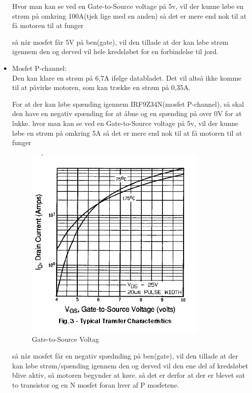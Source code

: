 \begin{itemize}
	Hvor man kan se ved en Gate-to-Source voltage på 5v, vil der kunne 
	løbe en strøm på omkring 100A(tjek lige med en anden) så det er mere end nok til at
	få motoren til at funger
	
	så når mosfet får 5V på ben(gate), vil den tillade at der kan løbe strøm
	igennem den og derved vil hele kredsløbet for en forbindelse til jord.
	\item 
	Mosfet P-channel: \\
	Den kan klare en strøm på 6,7A ifølge databladet. Det vil altså ikke komme til at påvirke motoren, som kan trække en strøm på 0,35A. 
	
	For at der kan løbe spænding igennem IRF9Z34N(mosfet P-channel), så skal den have en negativ spænding for at åbne og en spænding på over 0V for at lukke. 
	hvor man kan se ved en Gate-to-Source voltage på 5v, vil der kunne 
	løbe en strøm på omkring 5A så det er mere end nok til at
	få motoren til at funger
	\begin{figure}[H]
		\centering
		\includegraphics[width=\textwidth]{DesignOgImplementering/images/grafp}
		\caption{Gate-to-Source Voltag}
	\end{figure}
	så når mosfet får en negativ spædnding på ben(gate), vil den tillade at der kan løbe strøm/spænding
	igennem den og derved vil den ene del af kredsløbet blive aktiv, så motoren begynder at køre.
	så det er derfor at der er blevet sat to transistor og en N mosfet foran hver af P mosfetene.
	
	
\end{itemize}

